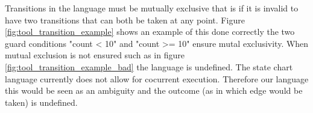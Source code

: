 Transitions in the language must be mutually exclusive that is if it is invalid to have two transitions that can both be taken at any point. Figure \ref{fig:tool_transition_example} shows an example of this done correctly the two guard conditions "count < 10" and "count >= 10" ensure mutal exclusivity. When mutual exclusion is not ensured such as in figure \ref{fig:tool_transition_example_bad} the language is undefined. The state chart language currently does not allow for cocurrent execution. Therefore our language this would be seen as an ambiguity and the outcome (as in which edge would be taken) is undefined.